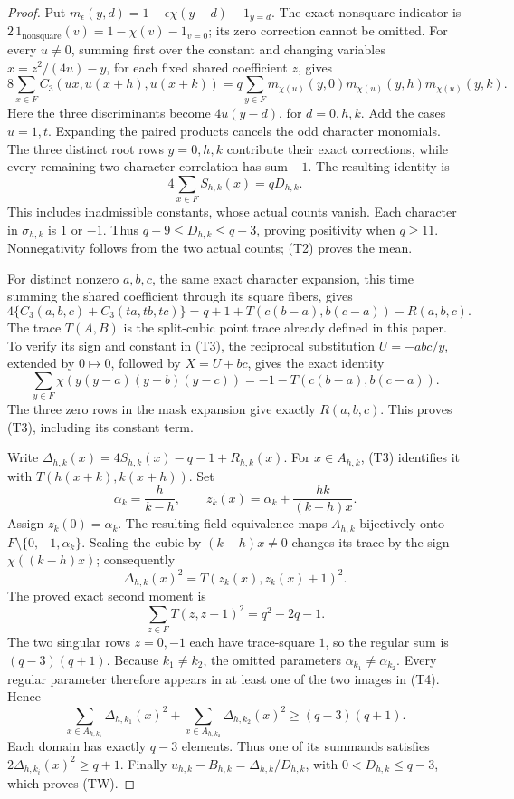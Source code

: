 \documentclass[11pt]{article}
\begin{document}
\begin{proof}
Put \(m_\epsilon(y,d)=1-\epsilon\chi(y-d)-1_{y=d}\).
The exact nonsquare indicator is
\(2\,1_{\text{nonsquare}}(v)=1-\chi(v)-1_{v=0}\);
its zero correction cannot be omitted. For every \(u\ne0\),
summing first over the constant and changing variables
\(x=z^2/(4u)-y\), for each fixed shared coefficient \(z\), gives
\[
 8\sum_{x\in F}C_3(ux,u(x+h),u(x+k))
 =q\sum_{y\in F}
       m_{\chi(u)}(y,0)m_{\chi(u)}(y,h)m_{\chi(u)}(y,k).
 \tag{T1}
\]
Here the three discriminants become \(4u(y-d)\), for \(d=0,h,k\).
Add the cases \(u=1,t\). Expanding the paired products cancels the
odd character monomials. The three distinct root rows \(y=0,h,k\)
contribute their exact corrections, while every remaining two-character
correlation has sum \(-1\). The resulting identity is
\[
 4\sum_{x\in F}S_{h,k}(x)=qD_{h,k}.
 \tag{T2}
\]
This includes inadmissible constants, whose actual counts vanish.
Each character in \(\sigma_{h,k}\) is \(1\) or \(-1\).
Thus \(q-9\le D_{h,k}\le q-3\), proving positivity when \(q\ge11\).
Nonnegativity follows from the two actual counts; (T2) proves the mean.

For distinct nonzero \(a,b,c\), the same exact character expansion,
this time summing the shared coefficient through its square fibers,
gives
\[
 4\{C_3(a,b,c)+C_3(ta,tb,tc)\}
 =q+1+T(c(b-a),b(c-a))-R(a,b,c).
 \tag{T3}
\]
The trace \(T(A,B)\) is the split-cubic point trace already defined
in this paper. To verify its sign and constant in (T3), the reciprocal
substitution \(U=-abc/y\), extended by \(0\mapsto0\), followed by
\(X=U+bc\), gives the exact identity
\[
 \sum_{y\in F}\chi(y(y-a)(y-b)(y-c))
       =-1-T(c(b-a),b(c-a)).
\]
The three zero rows in the mask expansion give exactly \(R(a,b,c)\).
This proves (T3), including its constant term.

Write
\(\Delta_{h,k}(x)=4S_{h,k}(x)-q-1+R_{h,k}(x)\).
For \(x\in A_{h,k}\), (T3) identifies it with
\(T(h(x+k),k(x+h))\).
Set
\[
 \alpha_k=\frac{h}{k-h},\qquad
 z_k(x)=\alpha_k+\frac{hk}{(k-h)x}.
\]
Assign \(z_k(0)=\alpha_k\). The resulting field equivalence maps
\(A_{h,k}\) bijectively onto \(F\setminus\{0,-1,\alpha_k\}\).
Scaling the cubic by \((k-h)x\ne0\) changes its trace by the sign
\(\chi((k-h)x)\); consequently
\[
 \Delta_{h,k}(x)^2=T(z_k(x),z_k(x)+1)^2.
 \tag{T4}
\]
The proved exact second moment is
\[
 \sum_{z\in F}T(z,z+1)^2=q^2-2q-1.
\]
The two singular rows \(z=0,-1\) each have trace-square \(1\), so
the regular sum is \((q-3)(q+1)\).
Because \(k_1\ne k_2\), the omitted parameters
\(\alpha_{k_1}\ne\alpha_{k_2}\). Every regular parameter therefore
appears in at least one of the two images in (T4). Hence
\[
 \sum_{x\in A_{h,k_1}}\Delta_{h,k_1}(x)^2+
 \sum_{x\in A_{h,k_2}}\Delta_{h,k_2}(x)^2
       \ge(q-3)(q+1).
 \tag{T5}
\]
Each domain has exactly \(q-3\) elements. Thus one of its summands
satisfies \(2\Delta_{h,k_i}(x)^2\ge q+1\).
Finally \(u_{h,k}-B_{h,k}=\Delta_{h,k}/D_{h,k}\), with
\(0<D_{h,k}\le q-3\), which proves (TW).
\end{proof}
\end{document}

